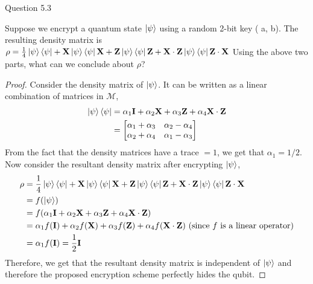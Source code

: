 \begin{solution}{Question 5.3}\label{ques:5.3}
    \begin{question}
    Suppose we encrypt a quantum state $\ket{\psi}$ using a random 2-bit key ( a, b). The resulting density matrix is\\
$ \rho = \frac{1}{4} \ket{\psi}\bra{\psi}+\mathbf{X}\ket{\psi}\bra{\psi}\mathbf{X}+\mathbf{Z}\ket{\psi}\bra{\psi}\mathbf{Z}+\mathbf{X}\cdot\mathbf{Z}\ket{\psi}\bra{\psi}\mathbf{Z}\cdot\mathbf{X}$
Using the above two parts, what can we conclude about $\rho$?
    \end{question}
    \tcblower{}
    \begin{proof}
    Consider the density matrix of $\ket{\psi}$. It can be written as a linear combination of matrices in $\mathcal{M}$,
    \begin{equation}
        \begin{split}
            \ket{\psi}\bra{\psi} &= \alpha_1\mathbf{I} + \alpha_2\mathbf{X} + \alpha_3\mathbf{Z} + \alpha_4\mathbf{X}\cdot\mathbf{Z}\\
                                 &= \begin{bmatrix}
                                        \alpha_1 + \alpha_3&\alpha_2-\alpha_4\\
                                        \alpha_2 + \alpha_4&\alpha_1 - \alpha_3
                                    \end{bmatrix}
        \end{split}
    \end{equation}
    From the fact that the density matrices have a trace $= 1$, we get that $\alpha_1 = 1/2$. Now consider the resultant density matrix after encrypting $\ket{\psi}$,
    \begin{equation}
        \begin{split}
            \rho &= \frac{1}{4} \ket{\psi}\bra{\psi}+\mathbf{X}\ket{\psi}\bra{\psi}\mathbf{X}+\mathbf{Z}\ket{\psi}\bra{\psi}\mathbf{Z}+\mathbf{X}\cdot\mathbf{Z}\ket{\psi}\bra{\psi}\mathbf{Z}\cdot\mathbf{X}\\
                 &= f(\ket{\psi})\\
                 &= f(\alpha_1\mathbf{I} + \alpha_2\mathbf{X} + \alpha_3\mathbf{Z} + \alpha_4\mathbf{X}\cdot\mathbf{Z})\\
                 &= \alpha_1 f(\mathbf{I}) + \alpha_2 f(\mathbf{X}) + \alpha_3 f(\mathbf{Z}) + \alpha_4 f(\mathbf{X}\cdot \mathbf{Z})\text{ (since $f$ is a linear operator)}\\
                 &= \alpha_1 f(\mathbf{I}) = \frac{1}{2}\mathbf{I}
        \end{split}
    \end{equation}
    Therefore, we get that the resultant density matrix is independent of $\ket{\psi}$ and therefore the proposed encryption scheme perfectly hides the qubit.
    \end{proof}
\end{solution}
